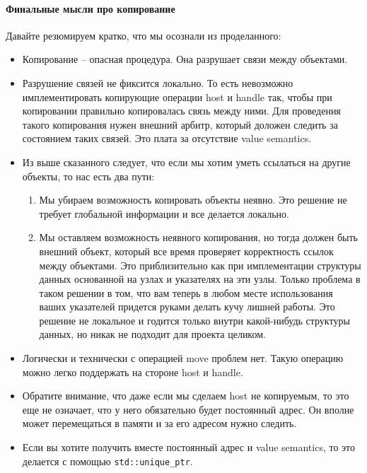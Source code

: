 \paragraph{Финальные мысли про копирование}

Давайте резюмируем кратко, что мы осознали из проделанного:
\begin{itemize}
\item Копирование -- опасная процедура.
Она разрушает связи между объектами.

\item Разрушение связей не фиксится локально.
То есть невозможно имплементировать копирующие операции host и handle так, чтобы при копировании правильно копировалась связь между ними.
Для проведения такого копирования нужен внешний арбитр, который доложен следить за состоянием таких связей.
Это плата за отсутствие value semantics.

\item Из выше сказанного следует, что если мы хотим уметь ссылаться на другие объекты, то нас есть два пути:
\begin{enumerate}
\item Мы убираем возможность копировать объекты неявно.
Это решение не требует глобальной информации и все делается локально.

\item Мы оставляем возможность неявного копирования, но тогда должен быть внешний объект, который все время проверяет корректность ссылок между объектами.
Это приблизительно как при имплементации структуры данных основанной на узлах и указателях на эти узлы.
Только проблема в таком решении в том, что вам теперь в любом месте использования ваших указателей придется руками делать кучу лишней работы.
Это решение не локальное и годится только внутри какой-нибудь структуры данных, но никак не подходит для проекта целиком.
\end{enumerate}

\item Логически и технически с операцией move проблем нет.
Такую операцию можно легко поддержать на стороне host и handle.

\item Обратите внимание, что даже если мы сделаем host не копируемым, то это еще не означает, что у него обязательно будет постоянный адрес.
Он вполне может перемещаться в памяти и за его адресом нужно следить.

\item Если вы хотите получить вместе постоянный адрес и value semantics, то это делается с помощью \verb"std::unique_ptr".
\end{itemize}

